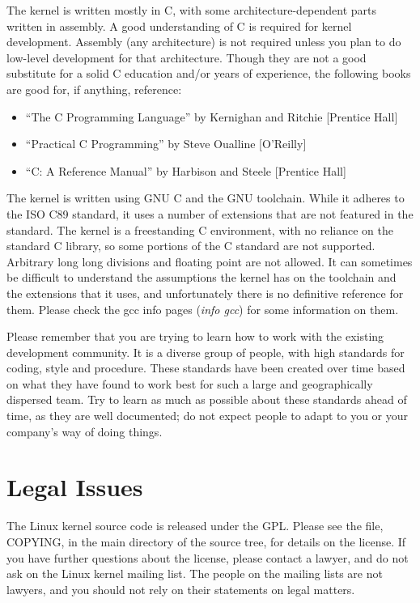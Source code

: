 \documentclass[a4paper,8pt,english]{sphinxmanual}
\begin{document}
The kernel is written mostly in C, with some architecture-dependent
parts written in assembly. A good understanding of C is required for
kernel development.  Assembly (any architecture) is not required unless
you plan to do low-level development for that architecture.  Though they
are not a good substitute for a solid C education and/or years of
experience, the following books are good for, if anything, reference:
\begin{itemize}
\item {} 
``The C Programming Language'' by Kernighan and Ritchie {[}Prentice Hall{]}

\item {} 
``Practical C Programming'' by Steve Oualline {[}O'Reilly{]}

\item {} 
``C:  A Reference Manual'' by Harbison and Steele {[}Prentice Hall{]}

\end{itemize}

The kernel is written using GNU C and the GNU toolchain.  While it
adheres to the ISO C89 standard, it uses a number of extensions that are
not featured in the standard.  The kernel is a freestanding C
environment, with no reliance on the standard C library, so some
portions of the C standard are not supported.  Arbitrary long long
divisions and floating point are not allowed.  It can sometimes be
difficult to understand the assumptions the kernel has on the toolchain
and the extensions that it uses, and unfortunately there is no
definitive reference for them.  Please check the gcc info pages (\emph{info
gcc}) for some information on them.

Please remember that you are trying to learn how to work with the
existing development community.  It is a diverse group of people, with
high standards for coding, style and procedure.  These standards have
been created over time based on what they have found to work best for
such a large and geographically dispersed team.  Try to learn as much as
possible about these standards ahead of time, as they are well
documented; do not expect people to adapt to you or your company's way
of doing things.


\section{Legal Issues}
\label{process/howto:legal-issues}
The Linux kernel source code is released under the GPL.  Please see the
file, COPYING, in the main directory of the source tree, for details on
the license.  If you have further questions about the license, please
contact a lawyer, and do not ask on the Linux kernel mailing list.  The
people on the mailing lists are not lawyers, and you should not rely on
their statements on legal matters.
\end{document}
